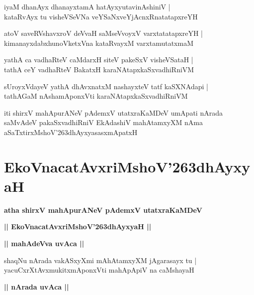 \documentclass[twoside,12pt,openright]{book}
\def\S{\char'263}
\newcounter{shloka}[chapter]
\def\uvaca#1{\centerline{{\large\textbf{#1}}}}
\begin{document}
\begin{shloka}%
iyaM dhanAyx dhanayxtamA hatAyxyutavinAshiniV |\\
kataRvAyx tu visheVSeVNa veYSaNxveYjAcnxRnatatapxreYH
\end{shloka}

\begin{shloka}%
atoV saveRVshavxroV deVvaH saMseVvoyxV varxtatatapxreYH |\\
kimanayxdabxhunoVketxVna kataRvayxM varxtamutatxmaM 
\end{shloka}

\begin{shloka}%
yathA ca vadhaRteV caMdarxH siteV pakeSxV visheVSataH |\\
tathA ceY vadhaRteV BakatxH karaNAtapxkaSxvadhiRniVM 
\end{shloka}

\begin{shloka}%
sUroyxVdayeV yathA dhAvxnatxM nashayxteV tatf kaSXNAdapi |\\
tathAGaM nAshamAponxVti karaNAtapxkaSxvadhiRniVM 
\end{shloka}

\begin{center}
iti shirxV mahApurANeV pAdemxV utatxraKaMDeV umApati nArada saMvAdeV  
pakaSxvadhiRniV EkAdashiV mahAtamxyXM nAma aSaTxtirxMshoV\S dhAyxyasasxmApatxH 
\end{center}

\chapter{EkoVnacatAvxriMshoV\S dhAyxyaH}

\begin{center}
{\LARGE\bfseries atha shirxV mahApurANeV pAdemxV utatxraKaMDeV}
\end{center}

\begin{center}
{\LARGE\bfseries || EkoVnacatAvxriMshoV\S dhAyxyaH ||}
\end{center}

\uvaca{|| mahAdeVva uvAca ||}

\begin{shloka}%
shaqNu nArada vakASxyXmi mAhAtamxyXM jAgarasayx tu |\\
yacuCxrXtAvxmukitxmAponxVti mahApApiV na caMshayaH
\end{shloka}

\uvaca{|| nArada uvAca ||}
\end{document}
